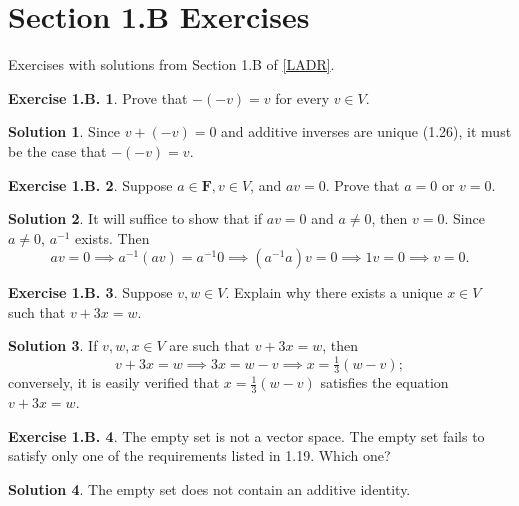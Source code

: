 \documentclass[12pt]{article}
\theoremstyle{definition}
\theoremstyle{exercise}
\newtheorem{exercise}{Exercise 1.B.}
\theoremstyle{solution}
\newtheorem*{solution}{Solution}
\newcommand{\F}{\mathbf{F}}
\begin{document}
\section{Section 1.B Exercises}

Exercises with solutions from Section 1.B of \hyperlink{ladr}{[LADR]}.

\begin{exercise}
\label{ex:1}
    Prove that \( -(-v) = v \) for every \( v \in V \).
\end{exercise}

\begin{solution}
    Since \( v + (-v) = 0 \) and additive inverses are unique (1.26), it must be the case that \( -(-v) = v \).
\end{solution}

\begin{exercise}
\label{ex:2}
    Suppose \( a \in \F, v \in V \), and \( av = 0 \). Prove that \( a = 0 \) or \( v = 0 \).
\end{exercise}

\begin{solution}
    It will suffice to show that if \( av = 0 \) and \( a \neq 0 \), then \( v = 0 \). Since \( a \neq 0 \), \( a^{-1} \) exists. Then
    \[
        av = 0 \implies a^{-1}(av) = a^{-1} 0 \implies (a^{-1} a)v = 0 \implies 1v = 0 \implies v = 0.
    \]
\end{solution}

\begin{exercise}
\label{ex:3}
    Suppose \( v, w \in V \). Explain why there exists a unique \( x \in V \) such that \( v + 3x = w \).
\end{exercise}

\begin{solution}
    If \( v, w, x \in V \) are such that \( v + 3x = w \), then
    \[
        v + 3x = w \implies 3x = w - v \implies x = \tfrac{1}{3}(w - v);
    \]
    conversely, it is easily verified that \( x = \tfrac{1}{3}(w - v) \) satisfies the equation \( v + 3x = w \).
\end{solution}

\begin{exercise}
\label{ex:4}
    The empty set is not a vector space. The empty set fails to satisfy only one of the requirements listed in 1.19. Which one?
\end{exercise}

\begin{solution}
    The empty set does not contain an additive identity.
\end{solution}
\end{document}

